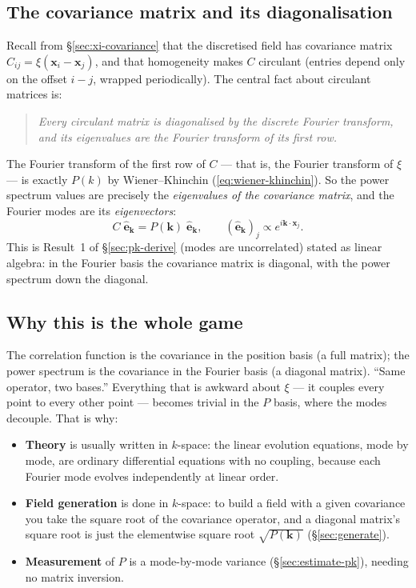 \documentclass[12pt]{article}
\newcommand{\bk}{\mathbf{k}}
\newcommand{\bx}{\mathbf{x}}
\begin{document}
\subsection{The covariance matrix and its diagonalisation}
\label{sec:cov-diag}

Recall from \S\ref{sec:xi-covariance} that the discretised field has
covariance matrix $C_{ij} = \xi(\bx_i - \bx_j)$, and that homogeneity
makes $C$ circulant (entries depend only on the offset $i - j$, wrapped
periodically).  The central fact about circulant matrices is:

\begin{quote}
\emph{Every circulant matrix is diagonalised by the discrete Fourier
transform, and its eigenvalues are the Fourier transform of its first
row.}
\end{quote}

The Fourier transform of the first row of $C$ --- that is, the Fourier
transform of $\xi$ --- is exactly $P(k)$ by Wiener--Khinchin
(\ref{eq:wiener-khinchin}).  So the power spectrum values are precisely
the \emph{eigenvalues of the covariance matrix}, and the Fourier modes
are its \emph{eigenvectors}:
\begin{equation}
  C\;\hat{\mathbf e}_\bk = P(\bk)\;\hat{\mathbf e}_\bk,
  \qquad
  (\hat{\mathbf e}_\bk)_j \propto e^{i\bk\cdot\bx_j}.
\end{equation}
This is Result~1 of \S\ref{sec:pk-derive} (modes are uncorrelated) stated
as linear algebra: in the Fourier basis the covariance matrix is
diagonal, with the power spectrum down the diagonal.

\subsection{Why this is the whole game}

The correlation function is the covariance in the position basis (a full
matrix); the power spectrum is the covariance in the Fourier basis (a
diagonal matrix).  ``Same operator, two bases.''  Everything that is
awkward about $\xi$ --- it couples every point to every other point ---
becomes trivial in the $P$ basis, where the modes decouple.  That is why:

\begin{itemize}
  \item \textbf{Theory} is usually written in $k$-space: the linear
        evolution equations, mode by mode, are ordinary differential
        equations with no coupling, because each Fourier mode evolves
        independently at linear order.
  \item \textbf{Field generation} is done in $k$-space: to build a field
        with a given covariance you take the square root of the
        covariance operator, and a diagonal matrix's square root is just
        the elementwise square root $\sqrt{P(\bk)}$
        (\S\ref{sec:generate}).
  \item \textbf{Measurement} of $P$ is a mode-by-mode variance
        (\S\ref{sec:estimate-pk}), needing no matrix inversion.
\end{itemize}
\end{document}
